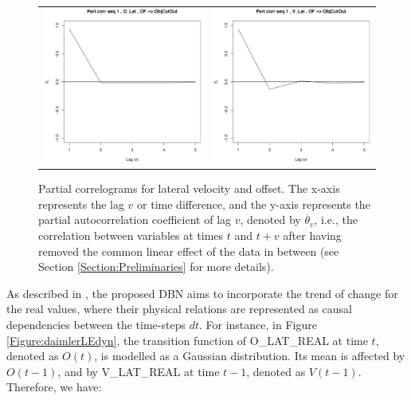 \begin{figure}[ht!]
  \centering
    \begin{tabular}{cc}
        \includegraphics[width=60mm]{figures/DaimlerPcorrOBJ_R5Offs.pdf}&
    \includegraphics[width=60mm]{figures/DaimlerPcorrOBJ_R5Vel.pdf}\\
  \end{tabular}
    \caption{\label{Figure:daimlerPartialCorrel}Partial correlograms for lateral velocity and offset. The x-axis represents the lag $v$ or time difference, and the y-axis represents the partial autocorrelation coefficient of lag $v$, denoted by $\ddot{\theta_v}$, i.e., the correlation between variables at times $t$ and $t+v$ after having removed the common linear effect of the data in between (see Section \ref{Section:Preliminaries} for more details).}
\end{figure}

As described in \cite{Weidl2014}, the proposed DBN aims to incorporate the trend of change for the real values, where their physical relations are represented as causal dependencies between the time-steps $dt$. For instance, in Figure \ref{Figure:daimlerLEdyn}, the transition function of O\_LAT\_REAL at time $t$, denoted as $O(t)$, is modelled as a Gaussian distribution. Its mean is affected by $O(t-1)$, and by V\_LAT\_REAL at time $t-1$, denoted as $V(t-1)$. Therefore, we have:

